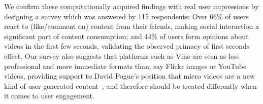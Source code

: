 We confirm these computationally acquired findings with real user impressions by designing a survey which was answered by 115 respondents: Over 66\% of users react to (like/comment on) content from their friends, making social interaction a significant part of content consumption; and 44\% of users form opinions about videos in the first few seconds, validating the observed primacy of first seconds effect. Our survey also suggests that platforms such as Vine are seen as less professional and more immediate formats than, say Flickr images or YouTube videos, providing support to David Pogue's  position that micro videos are a new kind of user-generated content~\cite{pogue13}, and therefore should be treated differently when it comes to user engagement.
%
%
%
%





%
%
%
%
%
%

